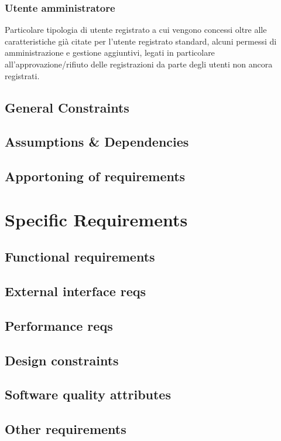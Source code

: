 \documentclass[12pt,a4paper]{report}
\begin{document}
\subsection{Utente amministratore}
Particolare tipologia di utente registrato a cui vengono concessi oltre alle caratteristiche già citate per l’utente registrato standard, alcuni permessi di amministrazione e gestione aggiuntivi, legati in particolare all’approvazione/rifiuto delle registrazioni da parte degli utenti non ancora registrati.



\section{General Constraints}
\section{Assumptions \& Dependencies}
\section{Apportoning of requirements}
\chapter{Specific Requirements}
\section{Functional requirements}
\section{External interface reqs}
\section{Performance reqs}
\section{Design constraints}
\section{Software quality attributes}
\section{Other requirements}
\end{document}
